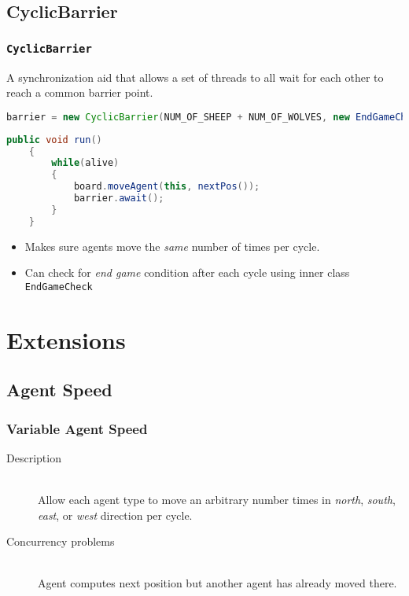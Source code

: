 \documentclass{beamer}
\begin{document}
\subsection{CyclicBarrier}
\begin{frame}[fragile]
	\frametitle{{\tt CyclicBarrier}}
	\begin{definition}
	A synchronization aid that allows a set of threads to all wait for each other to reach a common barrier point.
	\end{definition}

	\begin{lstlisting}[language=Java,caption={Initializing the {\tt CyclicBarrier} in {\tt Game.java}}]
	barrier = new CyclicBarrier(NUM_OF_SHEEP + NUM_OF_WOLVES, new EndGameCheck());
	\end{lstlisting}
	
	\begin{lstlisting}[language=Java,caption={Using the {\tt CyclicBarrier} in {\tt Agent.java}}]
	public void run()
	{
	    while(alive)
	    {
	        board.moveAgent(this, nextPos());
	        barrier.await();
	    }
	}
	\end{lstlisting}
	
	\begin{itemize}
		\item Makes sure agents move the {\em same} number of times per cycle.
		\item Can check for {\em end game} condition after each cycle using inner class {\tt EndGameCheck}
	\end{itemize}
\end{frame}

\section{Extensions}

\subsection{Agent Speed}
\begin{frame}
	\frametitle{Variable Agent Speed}	
	\begin{description}
		\item[Description] \hfill \\
		Allow each agent type to move an arbitrary number times in {\em north}, {\em south}, {\em east}, or {\em west} direction per cycle.
		\item[Concurrency problems] \hfill \\
		Agent computes next position but another agent has already moved there.
	\end{description}
\end{frame}
\end{document}

